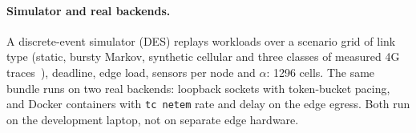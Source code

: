 \paragraph{Simulator and real backends.} A discrete-event simulator (DES) replays workloads over a
scenario grid of link type (static, bursty Markov, synthetic cellular and three classes of measured
4G traces~\cite{raca2018traces}), deadline, edge load, sensors per node and $\alpha$: 1296 cells.
The same bundle runs on two real backends: loopback sockets with token-bucket pacing, and Docker
containers with \texttt{tc netem} rate and delay on the edge egress. Both run on the development
laptop, not on separate edge hardware.
